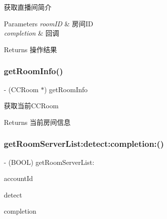 获取直播间简介 
\begin{DoxyParams}{Parameters}
{\em room\+ID} & 房间\+ID \\
\hline
{\em completion} & 回调 \\
\hline
\end{DoxyParams}
\begin{DoxyReturn}{Returns}
操作结果 
\end{DoxyReturn}
\mbox{\label{interface_c_c_streamer_basic_a3d9a24ed847067f8f71c815d5ce6c60e}} 
\subsubsection{\texorpdfstring{get\+Room\+Info()}{getRoomInfo()}}
{\footnotesize\ttfamily -\/ (C\+C\+Room $\ast$) get\+Room\+Info \begin{DoxyParamCaption}{ }\end{DoxyParamCaption}}

获取当前\+C\+C\+Room \begin{DoxyReturn}{Returns}
当前房间信息 
\end{DoxyReturn}
\mbox{\label{interface_c_c_streamer_basic_a5386b0515a0ef68004f343079d5d3d5f}} 
\subsubsection{\texorpdfstring{get\+Room\+Server\+List\+:detect\+:completion\+:()}{getRoomServerList:detect:completion:()}}
{\footnotesize\ttfamily -\/ (B\+O\+OL) get\+Room\+Server\+List\+: \begin{DoxyParamCaption}\item[{(N\+S\+String $\ast$)}]{account\+Id }\item[{detect:(B\+O\+OL)}]{detect }\item[{completion:(C\+C\+Comletion\+Block)}]{completion }\end{DoxyParamCaption}}

